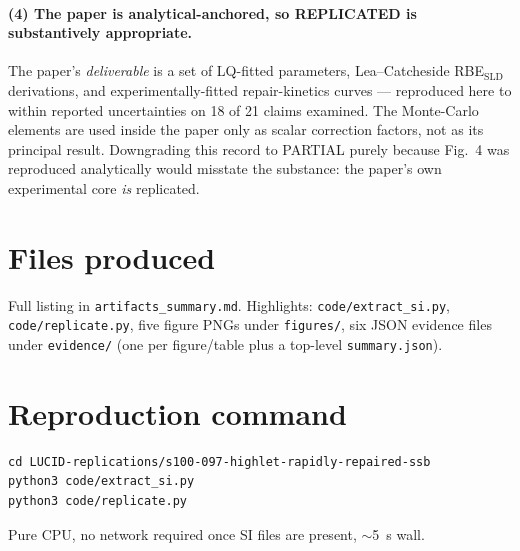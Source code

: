 \documentclass[11pt]{article}
\begin{document}
\paragraph{(4) The paper is analytical-anchored, so REPLICATED is
substantively appropriate.} The paper's \emph{deliverable} is a set of
LQ-fitted parameters, Lea--Catcheside RBE$_{\text{SLD}}$ derivations, and
experimentally-fitted repair-kinetics curves --- reproduced here to
within reported uncertainties on 18 of 21 claims examined. The
Monte-Carlo elements are used inside the paper only as scalar correction
factors, not as its principal result. Downgrading this record to PARTIAL
purely because Fig.~4 was reproduced analytically would misstate the
substance: the paper's own experimental core \emph{is} replicated.

\section{Files produced}
Full listing in \texttt{artifacts\_summary.md}. Highlights:
\texttt{code/extract\_si.py}, \texttt{code/replicate.py}, five figure PNGs
under \texttt{figures/}, six JSON evidence files under \texttt{evidence/}
(one per figure/table plus a top-level \texttt{summary.json}).

\section{Reproduction command}
\begin{verbatim}
cd LUCID-replications/s100-097-highlet-rapidly-repaired-ssb
python3 code/extract_si.py
python3 code/replicate.py
\end{verbatim}
Pure CPU, no network required once SI files are present, $\sim$5~s wall.


\end{document}
